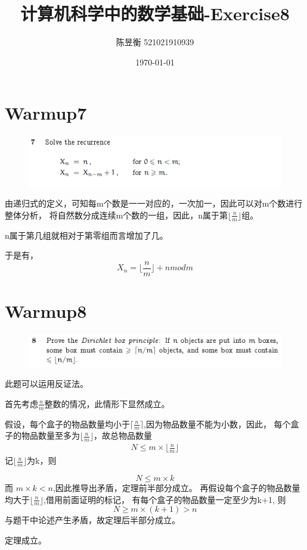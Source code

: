 \documentclass[]{article}
\title{计算机科学中的数学基础-Exercise8}
\author{陈昱衡 521021910939}
\date{\today}
\begin{document}
\maketitle

\section*{Warmup7}
\begin{figure}[H]
    \includegraphics[scale = 0.5]{2023-03-09-10-21-58.png}
\end{figure}
由递归式的定义，可知每m个数是一一对应的，一次加一，因此可以对m个数进行整体分析，
将自然数分成连续m个数的一组，因此，n属于第$\lfloor \frac{n}{m} \rfloor$组。
\par 
n属于第几组就相对于第零组而言增加了几。\par 
于是有，
\begin{equation}
    X_{n} = \lfloor \frac{n}{m} \rfloor + n mod m
\end{equation}


\section*{Warmup8}

\begin{figure}[H]
    \includegraphics[scale = 0.5]{2023-03-09-10-25-13.png}
\end{figure}
此题可以运用反证法。\par 
首先考虑$\frac{n}{m}$整数的情况，此情形下显然成立。\par 
假设，每个盒子的物品数量均小于$\lceil \frac{n}{m} \rceil$,因为物品数量不能为小数，因此，
每个盒子的物品数量至多为$\lfloor \frac{n}{m} \rfloor$，故总物品数量
\begin{align}
    N \le m \times \lfloor \frac{n}{m} \rfloor
\end{align}
记$\lfloor \frac{n}{m} \rfloor$为k，则

\begin{equation}
    N \le m \times k
\end{equation}
而 $m \times k  < n$,因此推导出矛盾，定理前半部分成立。
再假设每个盒子的物品数量均大于$\lfloor \frac{n}{m} \rfloor$,借用前面证明的标记，
有每个盒子的物品数量一定至少为k+1,
则
\begin{equation}
    N \ge m \times (k+1) > n
\end{equation}
与题干中论述产生矛盾，故定理后半部分成立。\par 
定理成立。
\end{document}
